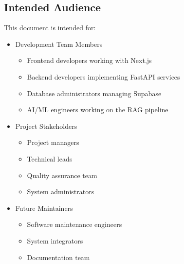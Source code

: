 \subsection{Intended Audience}
This document is intended for:
\begin{itemize}
    \item Development Team Members
    \begin{itemize}
        \item Frontend developers working with Next.js
        \item Backend developers implementing FastAPI services
        \item Database administrators managing Supabase
        \item AI/ML engineers working on the RAG pipeline
    \end{itemize}

    \item Project Stakeholders
    \begin{itemize}
        \item Project managers
        \item Technical leads
        \item Quality assurance team
        \item System administrators
    \end{itemize}

    \item Future Maintainers
    \begin{itemize}
        \item Software maintenance engineers
        \item System integrators
        \item Documentation team
    \end{itemize}
\end{itemize} 